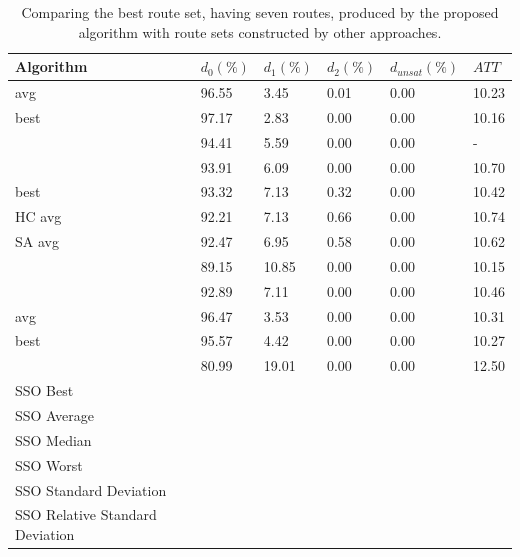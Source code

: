     \begin{table}[H]
    \centering
    \begin{tabular}{|l||l|l|l|l|l|}
    \hline
    Algorithm & $d_0(\%)$ & $d_1(\%)$ & $d_2(\%)$ & $d_{unsat}(\%)$ & $ATT$ \\
    \hline
    \citet{kechagiopoulos14} avg & 96.55 & 3.45 & 0.01 & 0.00 & 10.23 \\
    \citet{kechagiopoulos14} best & 97.17 & 2.83 & 0.00 & 0.00 & 10.16 \\
    \citet{nikolic14} & 94.41 & 5.59 & 0.00 & 0.00 & - \\
    \citet{kidwai98} & 93.91 & 6.09 & 0.00 & 0.00 & 10.70 \\
    \citet{fan10} best & 93.32 & 7.13 & 0.32 & 0.00 & 10.42  \\
    \citet{fan10} HC avg & 92.21 & 7.13 & 0.66 & 0.00 & 10.74 \\
    \citet{fan10} SA avg & 92.47 & 6.95 & 0.58 & 0.00 & 10.62 \\
    \citet{chakroborty02} & 89.15 & 10.85 & 0.00 & 0.00 & 10.15 \\
    \citet{zhang10} & 92.89 & 7.11 & 0.00 & 0.00 & 10.46 \\
    \citet{chew12} avg & 96.47 & 3.53 & 0.00 & 0.00 & 10.31 \\
    \citet{chew12} best & 95.57 & 4.42 & 0.00 & 0.00 & 10.27 \\
    \citet{baaj91} & 80.99 & 19.01 & 0.00 & 0.00 & 12.50 \\
    \hline
    \hline
    SSO Best & ~ & ~ & ~ & ~ & ~ \\
    SSO Average & ~ & ~ & ~ & ~ & ~ \\
    SSO Median & ~ & ~ & ~ & ~ & ~ \\
    SSO Worst & ~ & ~ & ~ & ~ & ~ \\
    SSO Standard Deviation & ~ & ~ & ~ & ~ & ~ \\
    SSO Relative Standard Deviation & ~ & ~ & ~ & ~ & ~ \\
    \hline
    \end{tabular}
    \caption {Comparing the best route set, having seven routes, produced by the proposed algorithm with route sets constructed by other approaches.}
    \label{table:performanceComparison_7}
    \end{table}

